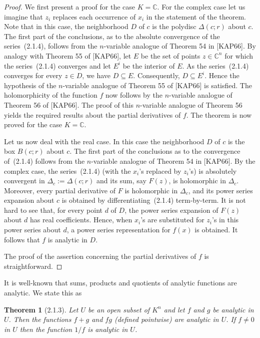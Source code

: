 \documentclass[11pt]{article}
\theoremstyle{plain}
\newtheorem*{theorem*}{Theorem}
\theoremstyle{definition}
\newcommand{\C}{\mathbb{C}}
\begin{document}
\begin{proof}
We first present a proof for the case $K = \C$. For the complex case let
us imagine that $z_i$ replaces each occurrence of $x_i$ in the statement
of the theorem. Note that in this case, the neighborhood $D$ of $c$ is
the polydisc $\Delta(c;r)$ about $c$. The first part of the conclusions,
as to the absolute convergence of the series~(2.1.4), follows from the
$n$-variable analogue of Theorem 54 in [KAP66]. By analogy with
Theorem 55 of [KAP66], let $E$ be the set of points $z \in \C^n$ for
which the series~(2.1.4) converges and let $E^i$ be the interior of $E$.
As the series~(2.1.4) converges for every $z \in D$, we have $D \subseteq E$.
Consequently, $D \subseteq E^i$. Hence the hypothesis of the $n$-variable
analogue of Theorem 55 of [KAP66] is satisfied. The holomorphicity of
the function $f$ now follows by the $n$-variable analogue of Theorem 56
of [KAP66]. The proof of this $n$-variable analogue of Theorem 56
yields the required results about the partial derivatives of $f$. The
theorem is now proved for the case $K = \C$.

Let us now deal with the real case. In this case the neighborhood $D$ of
$c$ is the box $B(c;r)$ about $c$. The first part of the conclusions as
to the convergence of~(2.1.4) follows from the $n$-variable analogue of
Theorem 54 in [KAP66]. By the complex case, the series~(2.1.4) (with the
$x_i$'s replaced by $z_i$'s) is absolutely convergent in
$\Delta_c := \Delta(c;r)$ and its sum, say $F(z)$, is holomorphic in
$\Delta_c$. Moreover, every partial derivative of $F$ is holomorphic in
$\Delta_c$, and its power series expansion about $c$ is obtained by
differentiating~(2.1.4) term-by-term. It is not hard to see that, for
every point $d$ of $D$, the power series expansion of $F(z)$ about $d$
has real coefficients. Hence, when $x_i$'s are substituted for $z_i$'s in
this power series about $d$, a power series representation for $f(x)$ is
obtained. It follows that $f$ is analytic in $D$.

The proof of the assertion concerning the partial derivatives of $f$ is
straightforward.
\end{proof}

It is well-known that sums, products and quotients of analytic functions
are analytic. We state this as

\begin{theorem*}[2.1.3]
Let $U$ be an open subset of $K^n$ and let $f$ and $g$ be analytic in
$U$. Then the functions $f + g$ and $fg$ (defined pointwise) are analytic
in $U$. If $f \ne 0$ in $U$ then the function $1/f$ is analytic in $U$.
\end{theorem*}
\end{document}
